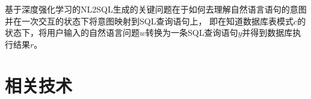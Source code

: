 基于深度强化学习的NL2SQL生成的关键问题在于如何去理解自然语言语句的意图并在一次交互的状态下将意图映射到SQL查询语句上，
即在知道数据库表模式$c$的状态下，将用户输入的自然语言问题$w$转换为一条SQL查询语句$y$并得到数据库执行结果$r$。



  


  

\section{相关技术}

